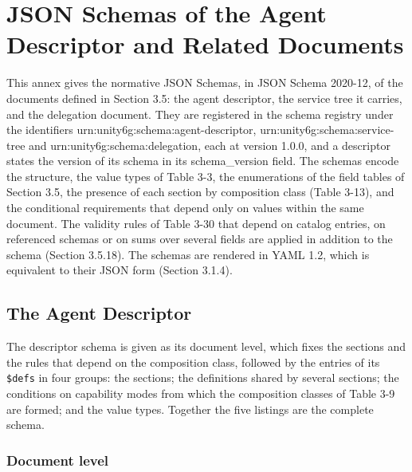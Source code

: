 
\hypertarget{annex-a-json-schemas-of-the-agent-descriptor-and-related-documents}{%
\section{JSON Schemas of the Agent Descriptor and Related Documents}\label{annex-a-json-schemas-of-the-agent-descriptor-and-related-documents}}

This annex gives the normative JSON Schemas, in JSON Schema 2020-12, of
the documents defined in Section 3.5: the agent descriptor, the service
tree it carries, and the delegation document. They are registered in the
schema registry under the identifiers
urn:unity6g:schema:agent-descriptor, urn:unity6g:schema:service-tree and
urn:unity6g:schema:delegation, each at version 1.0.0, and a descriptor
states the version of its schema in its schema\_\allowbreak{}version
field. The schemas encode the structure, the value types of Table 3-3,
the enumerations of the field tables of Section 3.5, the presence of
each section by composition class (Table 3-13), and the conditional
requirements that depend only on values within the same document. The
validity rules of Table 3-30 that depend on catalog entries, on
referenced schemas or on sums over several fields are applied in
addition to the schema (Section 3.5.18). The schemas are rendered in
YAML 1.2, which is equivalent to their JSON form (Section 3.1.4).

\hypertarget{a.1-the-agent-descriptor}{%
\subsection{The Agent Descriptor}\label{a.1-the-agent-descriptor}}

The descriptor schema is given as its document level, which fixes the
sections and the rules that depend on the composition class, followed by
the entries of its \texttt{\$defs} in four groups: the sections; the
definitions shared by several sections; the conditions on capability
modes from which the composition classes of Table 3-9 are formed; and
the value types. Together the five listings are the complete schema.

\hypertarget{a.1.1-document-level}{%
\subsubsection{Document level}\label{a.1.1-document-level}}


